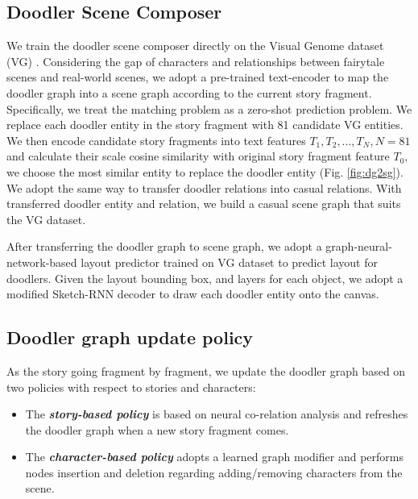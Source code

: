 \subsection{Doodler Scene Composer}
\label{sec:scene_composer}
We train the doodler scene composer directly on the Visual Genome dataset (VG) \cite{Krishna2017}. Considering the gap of characters and relationships between fairytale scenes and real-world scenes, we adopt a pre-trained text-encoder \cite{Radford2021LearningTV} to map the doodler graph into a scene graph according to the current story fragment. Specifically, we treat the matching problem as a zero-shot prediction problem. We replace each doodler entity in the story fragment with 81 candidate VG entities. We then encode candidate story fragments into text features ${T_1,T_2, ..., T_N}, N=81$ and calculate their scale cosine similarity with original story fragment feature $T_0$, we choose the most similar entity to replace the doodler entity (Fig. \ref{fig:dg2sg}). We adopt the same way to transfer doodler relations into casual relations. With transferred doodler entity and relation, we build a casual scene graph that suits the VG dataset.

After transferring the doodler graph to scene graph, we adopt a graph-neural-network-based layout predictor \cite{Johnson2018} trained on VG dataset to predict layout for doodlers. Given the layout bounding box, and layers for each object, we adopt a modified Sketch-RNN decoder \cite{Huang2019} to draw each doodler entity onto the canvas. 


\subsection{Doodler graph update policy}
As the story going fragment by fragment, we update the doodler graph based on two policies with respect to stories and characters:
\begin{itemize}
    \item The \textit{\textbf{story-based policy}} is based on neural co-relation analysis and refreshes the doodler graph when a new story fragment comes. 
    \item The \textit{\textbf{character-based policy}} adopts a learned graph modifier and performs nodes insertion and deletion regarding adding/removing characters from the scene.
\end{itemize}

